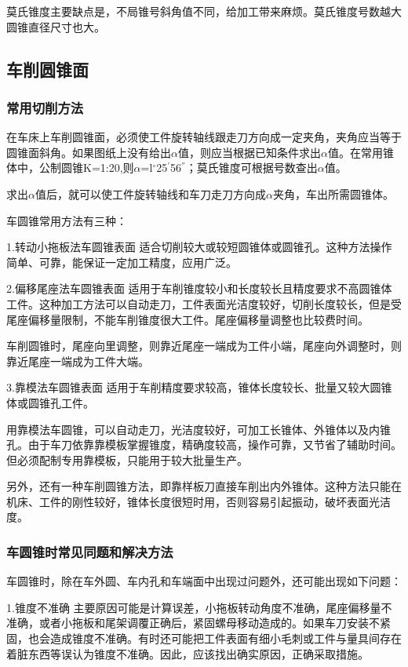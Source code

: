 \documentclass{ctexbook}
\begin{document}
莫氏锥度主要缺点是，不局锥号斜角值不同，给加工带来麻烦。莫氏锥度号数越大圆锥直径尺寸也大。
\subsection{车削圆锥面}
\subsubsection{常用切削方法}
在车床上车削圆锥面，必须使工件旋转轴线跟走刀方向成一定夹角，夹角应当等于圆锥面斜角。如果图纸上没有给出$\alpha$值，则应当根据已知条件求出$\alpha$值。在常用锥体中，公制圆锥K=1:20,则$\alpha$=l$^{\circ}$25$^{'}$56$^{''}$；莫氏锥度可根据号数查出$\alpha$值。

求出$\alpha$值后，就可以使工件旋转轴线和车刀走刀方向成$\alpha$夹角，车出所需圆锥体。

车圆锥常用方法有三种：

1.转动小拖板法车圆锥表面 适合切削较大或较短圆锥体或圆锥孔。这种方法操作简单、可靠，能保证一定加工精度，应用广泛。

2.偏移尾座法车圆锥表面 适用于车削锥度较小和长度较长且精度要求不高圆锥体工件。这种加工方法可以自动走刀，工件表面光洁度较好，切削长度较长，但是受尾座偏移量限制，不能车削锥度很大工件。尾座偏移量调整也比较费时间。

车削圆锥时，尾座向里调整，则靠近尾座一端成为工件小端，尾座向外调整时，则靠近尾座一端成为工件大端。

3.靠模法车圆锥表面 适用于车削精度要求较高，锥体长度较长、批量又较大圆锥体或圆锥孔工件。

用靠模法车圆锥，可以自动走刀，光洁度较好，可加工长锥体、外锥体以及内锥孔。由于车刀依靠靠模板掌握锥度，精确度较高，操作可靠，又节省了辅助时间。但必须配制专用靠模板，只能用于较大批量生产。

另外，还有一种车削圆锥方法，即靠样板刀直接车削出内外锥体。这种方法只能在机床、工件的刚性较好，锥体长度很短时用，否则容易引起振动，破坏表面光洁度。
\subsubsection{车圆锥时常见同题和解决方法}
车圆锥时，除在车外圆、车内孔和车端面中出现过问题外，还可能出现如下问题：

1.锥度不准确 主要原因可能是计算误差，小拖板转动角度不准确，尾座偏移量不准确，或者小拖板和尾架调覆正确后，紧固螺母移动造成的。如果车刀安装不紧固，也会造成锥度不准确。有时还可能把工件表面有细小毛刺或工件与量具间存在着脏东西等误认为锥度不准确。因此，应该找出确实原因，正确采取措施。
\end{document}
